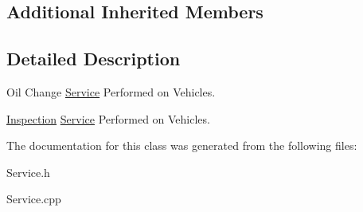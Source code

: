 \subsection*{Additional Inherited Members}


\subsection{Detailed Description}
Oil Change \hyperlink{class_service}{Service} Performed on Vehicles. 

\hyperlink{class_inspection}{Inspection} \hyperlink{class_service}{Service} Performed on Vehicles. 

The documentation for this class was generated from the following files\+:\begin{DoxyCompactItemize}
\item 
Service.\+h\item 
Service.\+cpp\end{DoxyCompactItemize}
